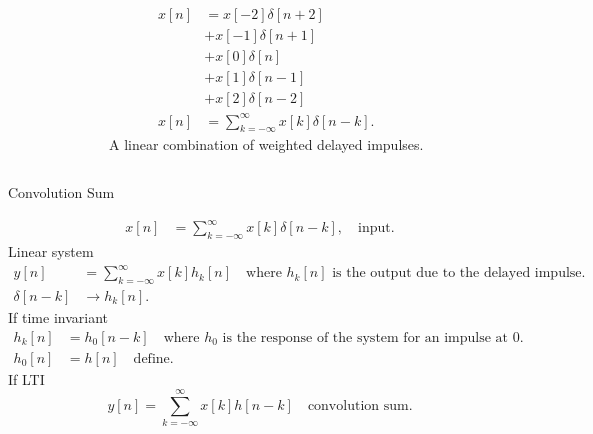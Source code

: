 \begin{frame}[plain]
    {
        \begin{columns}
                \begin{figure}
                  \centering
                  
                  \caption{}\label{fi:dt_as_superposition}
                \end{figure}
            \begin{align*}
              x[n] &= x[-2]\delta[n+2] \\
              &  + x[-1]\delta[n+1] \\
              &  + x[0]\delta[n] \\
              &  + x[1]\delta[n-1] \\
              &  + x[2]\delta[n-2] \\
              x[n] &= \sum_{k=-\infty}^{\infty}x[k]\delta[n-k].
            \end{align*}
            A linear combination of weighted delayed impulses.
        \end{columns}
    }
\end{frame}


\begin{frame}{Convolution Sum}
    {
    \begin{align*}
        x[n] &= \sum_{k=-\infty}^{\infty}x[k]\delta[n-k], \quad \text{input}.
    \end{align*}
    \pause
    Linear system
    \pause
    \begin{align*}
        y[n] &= \sum_{k=-\infty}^{\infty}x[k]h_k[n] \quad \text{where }h_k[n] \text{ is the output due to the delayed impulse}.\\
        \delta[n-k] &\rightarrow h_k[n].
    \end{align*}
    \pause
    If time invariant
    \pause
    \begin{align*}
        h_k[n] &= h_0[n-k] \quad \text{where }h_0 \text{ is the response of the system for an impulse at 0}.\\
        h_0[n] &= h[n] \quad \text{define}.
    \end{align*}
    \pause
    If LTI
    \begin{equation*}
        \boxed{y[n] = \sum_{k=-\infty}^{\infty}x[k]h[n-k]}\quad \text{convolution sum}.
    \end{equation*}

    }
\end{frame}




